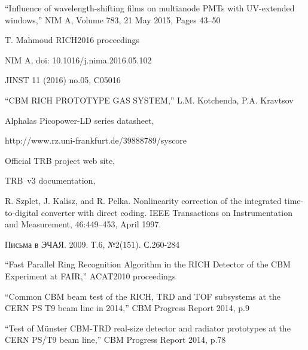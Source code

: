 \begin{thebibliography}{99}

``Influence of wavelength-shifting films on multianode PMTs with UV-extended windows,''
NIM A, Volume 783, 21 May 2015, Pages 43–50

T. Mahmoud RICH2016 proceedings

NIM A, doi: 10.1016/j.nima.2016.05.102

JINST 11 (2016) no.05, C05016

``CBM RICH PROTOTYPE GAS SYSTEM,''
L.M. Kotchenda, P.A. Kravtsov

Alphalas Picopower-LD series datasheet,

http://www.rz.uni-frankfurt.de/39888789/syscore

Official TRB project web site,

TRB~v3 documentation,

R. Szplet, J. Kalisz, and R. Pelka. Nonlinearity correction of the integrated time-to-digital converter with direct coding. IEEE Transactions on Instrumentation and Measurement, 46:449–453, April 1997.

Письма в ЭЧАЯ. 2009. Т.6, №2(151). С.260-284

``Fast Parallel Ring Recognition Algorithm in the RICH Detector of the CBM Experiment at FAIR,''
ACAT2010 proceedings

``Common CBM beam test of the RICH, TRD and TOF subsystems at the CERN PS T9 beam line in 2014,''
CBM Progress Report 2014, p.9

``Test of M\"unster CBM-TRD real-size detector and radiator prototypes at the CERN PS/T9 beam line,''
CBM Progress Report 2014, p.78


\end{thebibliography}

